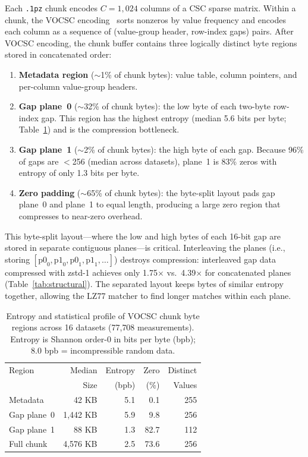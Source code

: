 \documentclass[10pt,twocolumn,letterpaper]{article}
\begin{document}
Each \texttt{.1pz} chunk encodes $C = 1{,}024$ columns of a CSC sparse matrix.
Within a chunk, the VOCSC encoding~\cite{wolfgang2024vcsc,ruiter2024vcsc} sorts nonzeros by value frequency and encodes each column as a sequence of (value-group header, row-index gaps) pairs.
After VOCSC encoding, the chunk buffer contains three logically distinct byte regions stored in concatenated order:

\begin{enumerate}
\item \textbf{Metadata region} ($\sim$1\% of chunk bytes): value table, column pointers, and per-column value-group headers.
\item \textbf{Gap plane~0} ($\sim$32\% of chunk bytes): the low byte of each two-byte row-index gap. This region has the highest entropy (median 5.6 bits per byte; Table~\ref{tab:entropy}) and is the compression bottleneck.
\item \textbf{Gap plane~1} ($\sim$2\% of chunk bytes): the high byte of each gap. Because 96\% of gaps are $<$256 (median across datasets), plane~1 is 83\% zeros with entropy of only 1.3 bits per byte.
\item \textbf{Zero padding} ($\sim$65\% of chunk bytes): the byte-split layout pads gap plane~0 and plane~1 to equal length, producing a large zero region that compresses to near-zero overhead.
\end{enumerate}

This byte-split layout---where the low and high bytes of each 16-bit gap are stored in separate contiguous planes---is critical.
Interleaving the planes (i.e., storing $[\text{p0}_0, \text{p1}_0, \text{p0}_1, \text{p1}_1, \ldots]$) destroys compression: interleaved gap data compressed with zstd-1 achieves only 1.75$\times$ vs.\ 4.39$\times$ for concatenated planes (Table~\ref{tab:structural}).
The separated layout keeps bytes of similar entropy together, allowing the LZ77 matcher to find longer matches within each plane.

\begin{table}[h]
\centering
\caption{Entropy and statistical profile of VOCSC chunk byte regions across 16 datasets (77{,}708 measurements). Entropy is Shannon order-0 in bits per byte (bpb); 8.0 bpb = incompressible random data.}
\label{tab:entropy}
\footnotesize
\begin{tabular}{lrrrr}
\toprule
Region & Median & Entropy & Zero & Distinct \\
 & Size & (bpb) & (\%) & Values \\
\midrule
Metadata      &   42 KB & 5.1 &  0.1 & 255 \\
Gap plane~0   & 1{,}442 KB & 5.9 &  9.8 & 256 \\
Gap plane~1   &   88 KB & 1.3 & 82.7 & 112 \\
Full chunk    & 4{,}576 KB & 2.5 & 73.6 & 256 \\
\bottomrule
\end{tabular}
\end{table}
\end{document}
